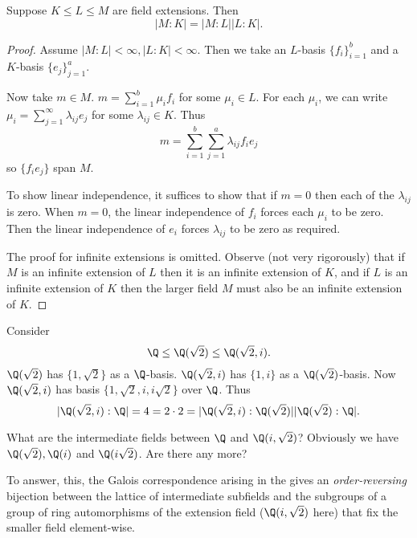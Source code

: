 \documentclass[a4paper]{article}
\begin{document}
\begin{theorem}
  \label{thm:tower}
  Suppose \(K \leq L \leq M\) are field extensions. Then
  \[
    |M:K| = |M:L||L:K|.
  \]
\end{theorem}

\begin{proof}
  Assume \(|M:L| < \infty, |L:K| < \infty\). Then we take an \(L\)-basis \(\{f_i\}_{i = 1}^b\) and a \(K\)-basis \(\{e_j\}_{j = 1}^a\).

  Now take \(m \in M\). \(m = \sum_{i = 1}^{b} \mu_if_i\) for some \(\mu_i \in L\). For each \(\mu_i\), we can write \(\mu_i = \sum_{j = 1}^{\infty} \lambda_{ij}e_j\) for some \(\lambda_{ij} \in K\). Thus
  \[
    m = \sum_{i = 1}^{b} \sum_{j = 1}^{a} \lambda_{ij} f_ie_j
  \]
  so \(\{f_ie_j\}\) span \(M\).

  To show linear independence, it suffices to show that if \(m = 0\) then each of the \(\lambda_{ij}\) is zero. When \(m = 0\), the linear independence of \(f_i\) forces each \(\mu_i\) to be zero. Then the linear independence of \(e_i\) forces \(\lambda_{ij}\) to be zero as required.

  The proof for infinite extensions is omitted. Observe (not very rigorously) that if \(M\) is an infinite extension of \(L\) then it is an infinite extension of \(K\), and if \(L\) is an infinite extension of \(K\) then the larger field \(M\) must also be an infinite extension of \(K\).
\end{proof}

\begin{eg}
  \label{eg:Q(sqrt 2, i)}
  Consider
  \[
    \Q \leq \Q(\sqrt 2) \leq \Q(\sqrt 2, i).
  \]
  \(\Q(\sqrt 2)\) has \(\{1, \sqrt 2\}\) as a \(\Q\)-basis. \(\Q(\sqrt 2, i)\) has \(\{1, i\}\) as a \(\Q(\sqrt 2)\)-basis. Now \(\Q(\sqrt 2, i)\) has basis \(\{1, \sqrt 2, i, i \sqrt 2\}\) over \(\Q\). Thus
  \[
    |\Q(\sqrt 2, i):\Q| = 4 = 2 \cdot 2 = |\Q(\sqrt 2, i):\Q(\sqrt 2)||\Q(\sqrt 2):\Q|.
  \]
\end{eg}

What are the intermediate fields between \(\Q\) and \(\Q(i, \sqrt 2)\)? Obviously we have \(\Q(\sqrt 2), \Q(i)\) and \(\Q(i\sqrt 2)\). Are there any more?

To answer, this, the Galois correspondence arising in the  gives an \emph{order-reversing} bijection between the lattice of intermediate subfields and the subgroups of a group of ring automorphisms of the extension field (\(\Q(i, \sqrt 2)\) here) that fix the smaller field element-wise.
\end{document}

